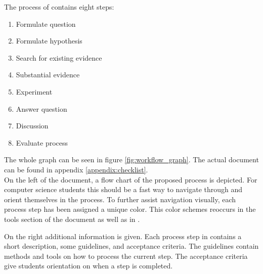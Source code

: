 \begin{minipage}{\linewidth}
The process of \checklist{} contains eight steps:
\begin{enumerate}
\item Formulate question
\item Formulate hypothesis
\item Search for existing evidence
\item Substantial evidence
\item Experiment
\item Answer question
\item Discussion
\item Evaluate process
\end{enumerate}


The whole graph can be seen in figure \ref{fig:workflow_graph}. The actual document can be found in appendix \ref{appendix:checklist}.\\
On the left of the document, a flow chart of the proposed process is depicted. For computer science students this should be a fast way to navigate through and orient themselves in the process. To further assist navigation visually, each process step has been assigned a unique color. This color schemes reoccurs in the tools section of the document as well as in \briefingform.

On the right additional information is given. Each process step in \checklist{} contains a short description, some guidelines, and acceptance criteria. The guidelines contain methods and tools on how to process the current step. The acceptance criteria give students orientation on when a step is completed.
\end{minipage}









